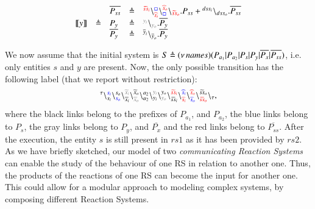\begin{example}
\[\begin{array}{lclcl}
&&\overline{P_{ss}}&\defeq &\startchain{{\color{red}\widetilde{ss}_i}}\chainedlink{{\color{red}\widehat{s}_i}}{{\color{blue}\noact}}\chainedlink{{\color{blue}\noact}}{{\color{red}\widehat{s}_o}}\chainend{{\color{red}\widetilde{ss}_o}}.P_{ss}
+
\startchain{dss_i}\chainend{dss_o}.\overline{P_{ss}}\\
\llbracket y\rrbracket&\defeq & P_{y}&\defeq &\startchain{{\color{gray}y_i}}\chainend{{\color{gray}y_o}}.\overline{P_{y}} \\
&&\overline{P_{y}}&\defeq &
\startchain{\overline{y}_i}\chainend{\overline{y}_o}.\overline{P_{y}}
\end{array}
\]

\end{example}

\noindent
We now assume that the initial system is $S \triangleq (\nu\, names)(P_{a_1}|P_{a_2}|P_s|P_y|\overline{P_x}|\overline{P_{ss}})$, i.e.
only entities $s$ and $y$ are present. Now, the only possible transition has  the following label (that we report without restriction):
\[
\startchain{\silent}\chainedlink{s_i}{{\color{blue}s_i}}\chainedlink{{\color{blue}s_o}}{s_o}\chainedlink{\widetilde{x}_i}{{\color{gray}\widetilde{x}_i}}\chainedlink{{\color{gray}\widetilde{x}_o}}{\widetilde{x}_o} \chainedlink{a_2}{a_2}\chainedlink{y_i}{ {\color{gray}y_i}}\chainedlink{{\color{gray}y_o}}{y_o}\chainedlink{\widetilde{ss}_i}{{\color{red}\widetilde{ss}_i}}
\chainedlink{{\color{red}\widehat{s}_i}}{{\color{blue}\widehat{s}_i}}
\chainedlink{{\color{blue}\widehat{s}_o}}{{\color{red}\widehat{s}_o}}
\chainedlink{{\color{red}\widetilde{ss}_o}}{\widetilde{ss}_o}\chainend{\silent},
\]
where the black links belong to the prefixes of $P_{a_1}$, and $P_{a_2}$, the blue links belong to $P_s$, the gray links belong to $P_y$, and $\overline{P_x}$ and the red links belong to $\overline{P_{ss}}$.
After the execution, the entity $s$ is still present in $rs1$ as it has been provided by $rs2$.\\

As we have briefly sketched, our model of two 
 \emph{communicating Reaction Systems} can enable the study of the behaviour of one RS in relation to another one. 
Thus, the products of the reactions of one RS can become the input for another one. 
This could allow for a modular approach to modeling complex systems, by composing different Reaction Systems. 





